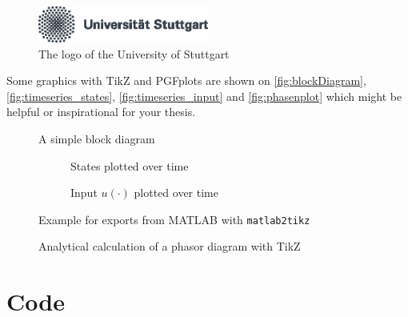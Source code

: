\begin{figure}[htb]
\centering
\includegraphics[width=0.5\textwidth]{images/logo-university-de.eps}
\caption{The logo of the University of Stuttgart}
\label{fig:ustutt_logo}
\end{figure}

Some graphics with TikZ and PGFplots are shown on \autoref{fig:blockDiagram}, \autoref{fig:timeseries_states}, \autoref{fig:timeseries_input} and \autoref{fig:phasenplot} which might be helpful or inspirational for your thesis.


\begin{figure}[htbp]
    \centering
    
    \caption{A simple block diagram}
    \label{fig:blockDiagram}
\end{figure}

\begin{figure}[htbp]

\centering
\begin{subfigure}[b]{0.95\textwidth}
    
    \caption{States plotted over time}
    \label{fig:timeseries_states}
\end{subfigure}

\begin{subfigure}[b]{0.95\textwidth}
    
    \caption{Input \(u(\cdot)\) plotted over time}
    \label{fig:timeseries_input}
\end{subfigure}

\caption{Example for exports from MATLAB with \texttt{matlab2tikz}}
\label{fig:timeseries}
\end{figure}


\begin{figure}[htbp]
    \centering
    
    \caption{Analytical calculation of a phasor diagram with TikZ \cite{Tantau2013}}
    \label{fig:phasenplot}
\end{figure}

\FloatBarrier

\section{Code}

